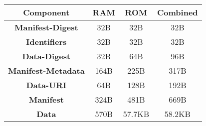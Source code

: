 \documentclass{standalone}
\begin{document}
\centering
\begin{tabular}[t]{cccc}
    \hline\hline
    \textbf{Component}             & RAM  & ROM    & Combined   \\
    \hline
    \textbf{Manifest-Digest}       & 32B  & 32B    & 32B        \\
    \textbf{Identifiers}           & 32B  & 32B    & 32B        \\
    \textbf{Data-Digest}           & 32B  & 64B    & 96B        \\
    \textbf{Manifest-Metadata}     & 164B & 225B   & 317B       \\
    \textbf{Data-URI}              & 64B  & 128B   & 192B       \\
    \hline
    \textbf{Manifest}              & 324B & 481B   & 669B       \\
    \hline\hline
    \textbf{Data}                  & 570B & 57.7KB & 58.2KB     \\
    \hline
\end{tabular}%
\end{document}
